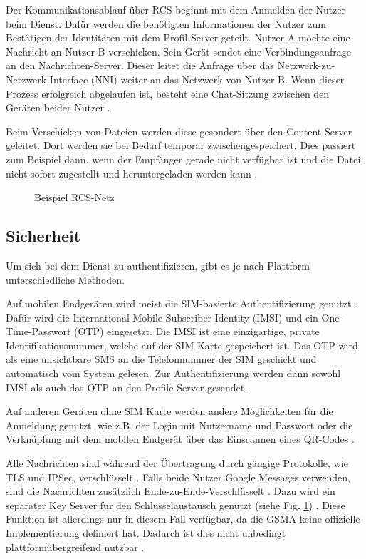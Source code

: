 \documentclass[conference]{IEEEtran}
\begin{document}
Der Kommunikationsablauf über RCS beginnt mit dem Anmelden der Nutzer beim Dienst.
Dafür werden die benötigten Informationen der Nutzer zum Bestätigen der Identitäten mit dem Profil-Server geteilt.
Nutzer A möchte eine Nachricht an Nutzer B verschicken.
Sein Gerät sendet eine Verbindungsanfrage an den Nachrichten-Server.
Dieser leitet die Anfrage über das Netzwerk-zu-Netzwerk Interface (NNI) weiter an das Netzwerk von Nutzer B.
Wenn dieser Prozess erfolgreich abgelaufen ist, besteht eine Chat-Sitzung zwischen den Geräten beider Nutzer \cite{5gmsg}.

Beim Verschicken von Dateien werden diese gesondert über den Content Server geleitet.
Dort werden sie bei Bedarf temporär zwischengespeichert.
Dies passiert zum Beispiel dann, wenn der Empfänger gerade nicht verfügbar ist und die Datei nicht sofort zugestellt und heruntergeladen werden kann \cite{5gmsg}.

\begin{figure}
    \centerline{}
    \caption{Beispiel RCS-Netz}
    \label{rcsnetz}
\end{figure}

\subsection{Sicherheit}

Um sich bei dem Dienst zu authentifizieren, gibt es je nach Plattform unterschiedliche Methoden.

Auf mobilen Endgeräten wird meist die SIM-basierte Authentifizierung genutzt \cite{uniprof}.
Dafür wird die International Mobile Subscriber Identity (IMSI) und ein One-Time-Passwort (OTP) eingesetzt.
Die IMSI ist eine einzigartige, private Identifikationsnummer, welche auf der SIM Karte gespeichert ist.
Das OTP wird als eine unsichtbare SMS an die Telefonnummer der SIM geschickt und automatisch vom System gelesen.
Zur Authentifizierung werden dann sowohl IMSI als auch das OTP an den Profile Server gesendet \cite{5gmsg}.

Auf anderen Geräten ohne SIM Karte werden andere Möglichkeiten für die Anmeldung genutzt, wie z.B. der Login mit Nutzername und Passwort oder die Verknüpfung mit dem mobilen Endgerät über das Einscannen eines QR-Codes \cite{uniprof}.

Alle Nachrichten sind während der Übertragung durch gängige Protokolle, wie TLS und IPSec, verschlüsselt \cite{uniprof}.
Falls beide Nutzer Google Messages verwenden, sind die Nachrichten zusätzlich Ende-zu-Ende-Verschlüsselt \cite{googlemessagessecure}.
Dazu wird ein separater Key Server für den Schlüsselaustausch genutzt (siehe Fig. \ref{rcsnetz}) \cite{5gmsg}.
Diese Funktion ist allerdings nur in diesem Fall verfügbar, da die GSMA keine offizielle Implementierung definiert hat.
Dadurch ist dies nicht unbedingt plattformübergreifend nutzbar \cite{googlemessagessecure}.
\end{document}
